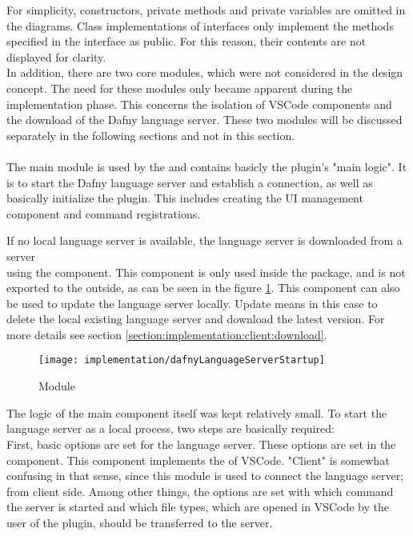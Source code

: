 For simplicity, constructors, private methods and private variables are omitted in the diagrams.
Class implementations of interfaces only implement the methods specified in the interface as public.
For this reason, their contents are not displayed for clarity. \\

In addition, there are two core modules, which were not considered in the design concept.
The need for these modules only became apparent during the implementation phase.
This concerns the isolation of VSCode components
and the download of the Dafny language server.
These two modules will be discussed separately in the following sections and not in this section. \\

\textbf{}\\
The main module  is used by the 
and contains basicly the plugin's "main logic".
It is to start the Dafny language server and establish a connection,
as well as basically initialize the plugin. This includes creating the UI management component and command registrations.

If no local language server is available, the language server is downloaded from a server \\
using the  component.
This component is only used inside the package, and is not exported to the outside,
as can be seen in the figure \ref{fig:placeholder_ref}.
This component can also be used to update the language server locally.
Update means in this case to delete the local existing language server and download the latest version.
For more details see section \ref{section:implementation:client:download}.

\begin{figure}[H]
    \centering
    \texttt{[image: implementation/dafnyLanguageServerStartup]}
    \caption{Module }
    \label{fig:placeholder_ref}
\end{figure}

The logic of the main component  itself was kept relatively small.
To start the language server as a local process, two steps are basically required:\\

First, basic options are set for the language server.
These options are set in the  component. This component implements the 
of VSCode. "Client" is somewhat confusing in that sense, since this module is used to connect the language server; from client side.
Among other things, the options are set with which command the server is started and which file types, which are opened in VSCode by the user of the plugin, should be transferred to the server. \\

